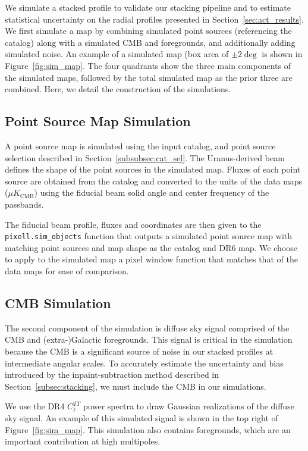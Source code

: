 We simulate a stacked profile to validate our stacking pipeline and to estimate statistical uncertainty on the radial profiles presented in Section~\ref{sec:act_results}.  We first simulate a map by combining simulated point sources (referencing the catalog) along with a simulated CMB and foregrounds, and additionally adding simulated noise.  An example of a simulated map (box area of $\pm2\deg$ is shown in Figure~\ref{fig:sim_map}.  The four quadrants show the three main components of the simulated maps, followed by the total simulated map as the prior three are combined.  Here, we detail the construction of the simulations.

\subsection{Point Source Map Simulation}
\label{subsec:sim_ptsrc}
A point source map is simulated using the input catalog, and point source selection described in Section~\ref{subsubsec:cat_sel}.  The Uranus-derived beam defines the shape of the point sources in the simulated map.  Fluxes of each point source are obtained from the catalog and converted to the units of the data maps ($\mu K_\text{CMB}$) using the fiducial beam solid angle and center frequency of the passbands.

The fiducial beam profile, fluxes and coordinates are then given to the \verb|pixell.sim_objects| function that outputs a simulated point source map with matching point sources and map shape as the catalog and DR6 map. We choose to apply to the simulated map a pixel window function that matches that of the data maps for ease of comparison.

\subsection{CMB Simulation}
\label{subsec:sim_cmb}
The second component of the simulation is diffuse sky signal comprised of the CMB and (extra-)Galactic foregrounds.  This signal is critical in the simulation because the CMB is a significant source of noise in our stacked profiles at intermediate angular scales.  To accurately estimate the uncertainty and bias introduced by the inpaint-subtraction method described in Section~\ref{subsec:stacking}, we must include the CMB in our simulations.

We use the DR4 $C_\ell^{TT}$ power spectra to draw Gaussian realizations of the diffuse sky signal. An example of this simulated signal is shown in the top right of Figure~\ref{fig:sim_map}.  This simulation also contains foregrounds, which are an important contribution at high multipoles.

